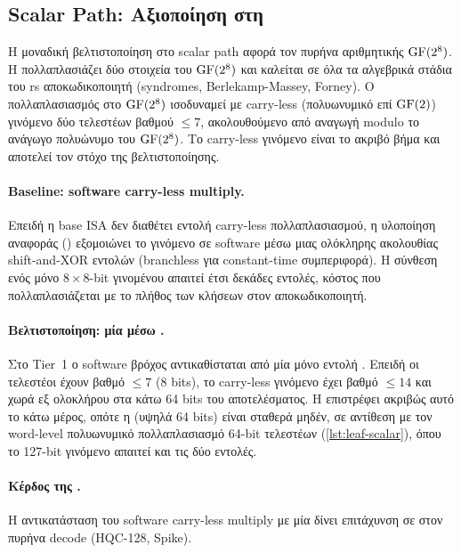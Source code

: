 \subsection{Scalar Path: Αξιοποίηση \Zbc στη }
\label{sec:decode-scalar}

Η μοναδική βελτιστοποίηση στο scalar path αφορά τον πυρήνα αριθμητικής
$\mathrm{GF}(2^8)$. Η  πολλαπλασιάζει δύο
στοιχεία του $\mathrm{GF}(2^8)$ και καλείται σε όλα τα αλγεβρικά στάδια του \gls{rs}
αποκωδικοποιητή (syndromes, Berlekamp-Massey, Forney). Ο πολλαπλασιασμός στο
$\mathrm{GF}(2^8)$ ισοδυναμεί με carry-less (πολυωνυμικό επί $\mathrm{GF}(2)$) γινόμενο δύο
τελεστέων βαθμού $\leq 7$, ακολουθούμενο από αναγωγή modulo το ανάγωγο
πολυώνυμο του $\mathrm{GF}(2^8)$. Το carry-less γινόμενο είναι το ακριβό βήμα και
αποτελεί τον στόχο της βελτιστοποίησης.

\paragraph{Baseline: software carry-less multiply.}
Επειδή η base ISA δεν διαθέτει εντολή carry-less πολλαπλασιασμού, η υλοποίηση
αναφοράς () εξομοιώνει το γινόμενο σε software μέσω
μιας ολόκληρης ακολουθίας shift-and-XOR εντολών (branchless για constant-time
συμπεριφορά). Η σύνθεση ενός μόνο $8\times8$-bit γινομένου απαιτεί έτσι δεκάδες
εντολές, κόστος που πολλαπλασιάζεται με το πλήθος των  κλήσεων
στον αποκωδικοποιητή.

\paragraph{Βελτιστοποίηση: μία \clmul{} μέσω \Zbc.}
Στο Tier~1 ο software βρόχος αντικαθίσταται από μία μόνο εντολή \clmul{}. 
Επειδή οι τελεστέοι έχουν βαθμό $\leq 7$ (8 bits), το carry-less γινόμενο έχει
βαθμό $\leq 14$ και χωρά εξ ολοκλήρου στα κάτω \num{64} bits του αποτελέσματος.
Η \clmul{} επιστρέφει ακριβώς αυτό το κάτω μέρος, οπότε η \clmulh{} (υψηλά
\num{64} bits) είναι σταθερά μηδέν, σε αντίθεση με τον word-level
πολυωνυμικό πολλαπλασιασμό \num{64}-bit τελεστέων (\cref{lst:leaf-scalar}), όπου
το \num{127}-bit γινόμενο απαιτεί και τις δύο εντολές.

\paragraph{Κέρδος της \Zbc{} \clmul{}.}
Η αντικατάσταση του software carry-less multiply με μία \clmul{} δίνει
επιτάχυνση  σε \instret στον πυρήνα decode (HQC-128, Spike).

